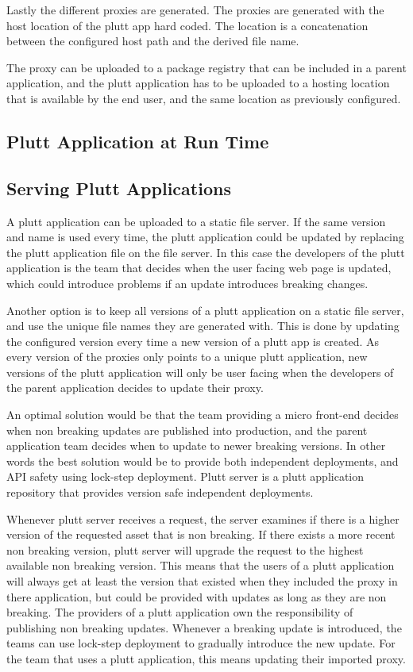 Lastly the different proxies are generated. The proxies are generated with the host location of the plutt app hard coded. The location is a concatenation between the configured host path and the derived file name.

The proxy can be uploaded to a package registry that can be included in a parent application, and the plutt application has to be uploaded to a hosting location that is available by the end user, and the same location as previously configured.

\subsection{Plutt Application at Run Time}



\subsection{Serving Plutt Applications}

A plutt application can be uploaded to a static file server. If the same version and name is used every time, the plutt application could be updated by replacing the plutt application file on the file server. In this case the developers of the plutt application is the team that decides when the user facing web page is updated, which could introduce problems if an update introduces breaking changes.

Another option is to keep all versions of a plutt application on a static file server, and use the unique file names they are generated with. This is done by updating the configured version every time a new version of a plutt app is created. As every version of the proxies only points to a unique plutt application, new versions of the plutt application will only be user facing when the developers of the parent application decides to update their proxy.

An optimal solution would be that the team providing a micro front-end decides when non breaking updates are published into production, and the parent application team decides when to update to newer breaking versions. In other words the best solution would be to provide both independent deployments, and API safety using lock-step deployment. Plutt server is a plutt application repository that provides version safe independent deployments.

Whenever plutt server receives a request, the server examines if there is a higher version of the requested asset that is non breaking. If there exists a more recent non breaking version, plutt server will upgrade the request to the highest available non breaking version. This means that the users of a plutt application will always get at least the version that existed when they included the proxy in there application, but could be provided with updates as long as they are non breaking. The providers of a plutt application own the responsibility of publishing non breaking updates. Whenever a breaking update is introduced, the teams can use lock-step deployment to gradually introduce the new update. For the team that uses a plutt application, this means updating their imported proxy.

